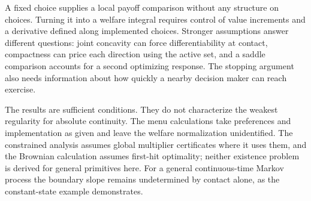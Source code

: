\documentclass[11pt]{article}
\begin{document}
A fixed choice supplies a local payoff comparison without any structure on choices. Turning it into a welfare integral requires control of value increments and a derivative defined along implemented choices. Stronger assumptions answer different questions: joint concavity can force differentiability at contact, compactness can price each direction using the active set, and a saddle comparison accounts for a second optimizing response. The stopping argument also needs information about how quickly a nearby decision maker can reach exercise.

The results are sufficient conditions. They do not characterize the weakest regularity for absolute continuity. The menu calculations take preferences and implementation as given and leave the welfare normalization unidentified. The constrained analysis assumes global multiplier certificates where it uses them, and the Brownian calculation assumes first-hit optimality; neither existence problem is derived for general primitives here. For a general continuous-time Markov process the boundary slope remains undetermined by contact alone, as the constant-state example demonstrates.
\end{document}
